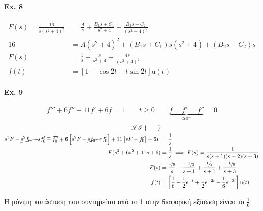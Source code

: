     \paragraph{Ex. 8}
    \begin{align*}
    F(s) = \frac{16}{s(s^2+4)^2} &=
    \frac{A}{s} + \frac{B_1s + C_1}{s^2+4} + \frac{B_2s+C_2}{(s^2+4)^2} \\
    16 &= A(s^2+4)^2 + (B_1s+C_1)s(s^2+4) + (B_2s+C_2)s \\
    F(s) &= \frac{1}{s} - \frac{s}{s^2+4} - \frac{4s}{(s^2+4)^2} \\
    f(t) &= \left[ 1-\cos 2t - t\sin 2t \right] \mathrm u(t)
    \end{align*}
    
    \paragraph{Ex. 9}
    \[
    f''' + 6f'' + 11f' + 6f = 1 \qquad t\geq 0 \qquad
    \underbrace{f=f'=f''}_{@ 0^-}=0
    \]
    \begin{align*}
    \mathscr{LT}\left\lbrace \qquad \right\rbrace & \\
    s^3F - \cancel{s^2f_0 - sf_0' -f_0''}
    +6 \left[ s^2F-\cancel{sf_0-f_0} \right]
     + 11 \left[ sF - \cancel{f_0} \right] + 6F
    &= \frac{1}{s} \\
    F(s^3+6s^2+11s+6)&= \frac{1}{s}
    \implies F(s) = \frac{1}{s(s+1)(s+2)(s+3)}
    \\ F(s) &= \frac{\sfrac{1}{6} }{s}
    + \frac{-\sfrac{1}{2} }{s+1}
    + \frac{\sfrac{1}{2} }{s+1}
    + \frac{-\sfrac{1}{6} }{s+3} \\
    f(t) &= \left[
    \frac{1}{6}-\frac{1}{2}e^{-t}+\frac{1}{2}e^{-2t}-\frac{1}{6}e^{-3t}
    \right]\mathrm u(t)
    \end{align*}
    
    Η μόνιμη κατάσταση που συντηρείται από το 1 στην διαφορική εξίσωση είναο το
    \( \frac{1}{6} \)
